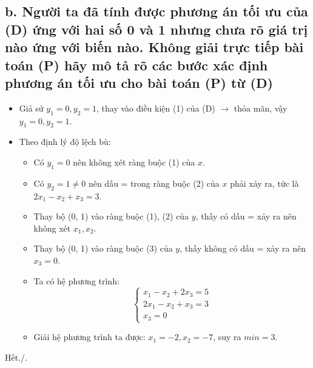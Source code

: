 \documentclass[12pt,a4paper]{article}
\begin{document}
		\subsection*{b. Người ta đã tính được phương án tối ưu của (D) ứng với hai số
0 và 1 nhưng chưa rõ giá trị nào ứng với biến nào. Không giải trực tiếp bài toán (P) hãy mô tả rõ các bước xác định phương án tối ưu cho bài toán (P) từ (D)}
			\begin{itemize}
				\item Giả sử $y_1 = 0, y_2 = 1$, thay vào điều kiện (1) của (D) $\rightarrow$ thỏa mãn, vậy $y_1 = 0, y_2 = 1$.
				\item Theo định lý độ lệch bù:
					\begin{itemize}
						\item Có $y_1 = 0$ nên không xét ràng buộc (1) của $x$.
						\item Có $y_2 = 1 \neq 0$ nên dấu = trong ràng buộc (2) của $x$ phải xảy ra, tức là $2x_1 - x_2 + x_3 = 3$.
						\item Thay bộ (0, 1) vào ràng buộc (1), (2) của $y$, thấy có dấu = xảy ra nên không xét $x_1, x_2$.
						\item Thay bộ (0, 1) vào ràng buộc (3) của $y$, thấy không có dấu = xảy ra nên $x_3 = 0$.
						\item Ta có hệ phương trình:
							\[\begin{cases}
								x_1 - x_2 + 2x_3 = 5\\
								2x_1 - x_2 + x_3 = 3\\
								x_3 = 0
							\end{cases}\]
						\item Giải hệ phương trình ta được: $x_1 = -2, x_2 = -7$, suy ra $min = 3$. 
					\end{itemize}
			\end{itemize}
	\begin{center}
		Hết./.
	\end{center}
\end{document}
